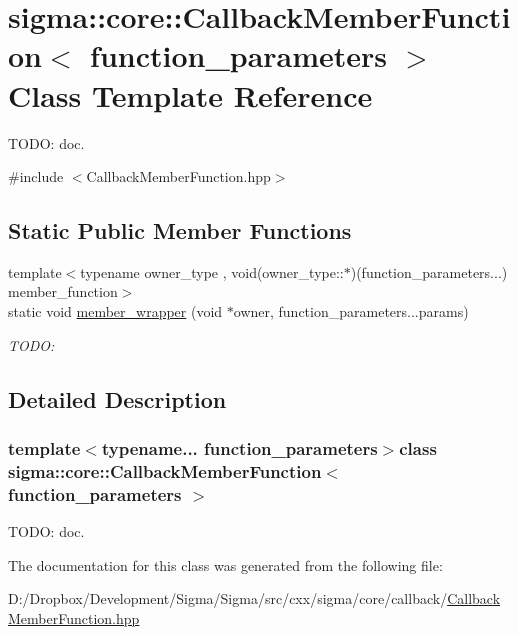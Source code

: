 \hypertarget{classsigma_1_1core_1_1_callback_member_function}{}\section{sigma\+:\+:core\+:\+:Callback\+Member\+Function$<$ function\+\_\+parameters $>$ Class Template Reference}
\label{classsigma_1_1core_1_1_callback_member_function}


T\+O\+D\+O\+: doc.  




{\ttfamily \#include $<$Callback\+Member\+Function.\+hpp$>$}

\subsection*{Static Public Member Functions}
\begin{DoxyCompactItemize}
\item 
\hypertarget{classsigma_1_1core_1_1_callback_member_function_afdf1dad7b9bea1df83d3587c9107c7e3}{}{\footnotesize template$<$typename owner\+\_\+type , void(owner\+\_\+type\+::$\ast$)(function\+\_\+parameters...) member\+\_\+function$>$ }\\static void \hyperlink{classsigma_1_1core_1_1_callback_member_function_afdf1dad7b9bea1df83d3587c9107c7e3}{member\+\_\+wrapper} (void $\ast$owner, function\+\_\+parameters...\+params)\label{classsigma_1_1core_1_1_callback_member_function_afdf1dad7b9bea1df83d3587c9107c7e3}

\begin{DoxyCompactList}\small\item\em T\+O\+D\+O\+: \end{DoxyCompactList}\end{DoxyCompactItemize}


\subsection{Detailed Description}
\subsubsection*{template$<$typename... function\+\_\+parameters$>$class sigma\+::core\+::\+Callback\+Member\+Function$<$ function\+\_\+parameters $>$}

T\+O\+D\+O\+: doc. 

The documentation for this class was generated from the following file\+:\begin{DoxyCompactItemize}
\item 
D\+:/\+Dropbox/\+Development/\+Sigma/\+Sigma/src/cxx/sigma/core/callback/\hyperlink{_callback_member_function_8hpp}{Callback\+Member\+Function.\+hpp}\end{DoxyCompactItemize}
